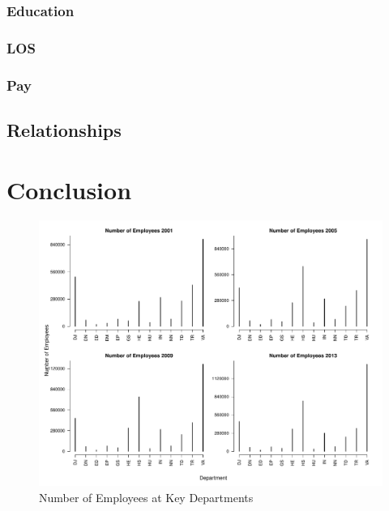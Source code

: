 \documentclass{article}
\begin{document}
        \subsubsection{Education}

        \subsubsection{LOS}

        \subsubsection{Pay}

    \subsection{Relationships}

\section{Conclusion}

\newpage

\begin{center}
    \begin{figure}
        \includegraphics[scale=0.4]{./images/simple-stat-agency.pdf}
        \caption{Number of Employees at Key Departments}
        \label{simpleagency}
    \end{figure}
\end{center}
\end{document}
